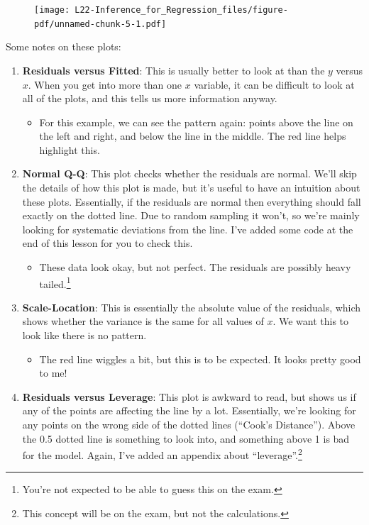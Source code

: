 \documentclass[
  letterpaper,
  DIV=11,
  numbers=noendperiod,
  oneside]{scrreprt}
\providecommand{\tightlist}{%
  \setlength{\itemsep}{0pt}\setlength{\parskip}{0pt}}\usepackage{longtable,booktabs,array}
\begin{document}
\begin{figure}[H]

{\centering \texttt{[image: L22-Inference\_for\_Regression\_files/figure-pdf/unnamed-chunk-5-1.pdf]}

}

\end{figure}

Some notes on these plots:

\begin{enumerate}
\def\labelenumi{\arabic{enumi}.}
\tightlist
\item
  \textbf{Residuals versus Fitted}: This is usually better to look at
  than the \(y\) versus \(x\). When you get into more than one \(x\)
  variable, it can be difficult to look at all of the plots, and this
  tells us more information anyway.

  \begin{itemize}
  \tightlist
  \item
    For this example, we can see the pattern again: points above the
    line on the left and right, and below the line in the middle. The
    red line helps highlight this.
  \end{itemize}
\item
  \textbf{Normal Q-Q}: This plot checks whether the residuals are
  normal. We'll skip the details of how this plot is made, but it's
  useful to have an intuition about these plots. Essentially, if the
  residuals are normal then everything should fall exactly on the dotted
  line. Due to random sampling it won't, so we're mainly looking for
  systematic deviations from the line. I've added some code at the end
  of this lesson for you to check this.

  \begin{itemize}
  \tightlist
  \item
    These data look okay, but not perfect. The residuals are possibly
    heavy tailed.\footnote{You're not expected to be able to guess this
      on the exam.}
  \end{itemize}
\item
  \textbf{Scale-Location}: This is essentially the absolute value of the
  residuals, which shows whether the variance is the same for all values
  of \(x\). We want this to look like there is no pattern.

  \begin{itemize}
  \tightlist
  \item
    The red line wiggles a bit, but this is to be expected. It looks
    pretty good to me!
  \end{itemize}
\item
  \textbf{Residuals versus Leverage}: This plot is awkward to read, but
  shows us if any of the points are affecting the line by a lot.
  Essentially, we're looking for any points on the wrong side of the
  dotted lines (``Cook's Distance''). Above the 0.5 dotted line is
  something to look into, and something above 1 is bad for the model.
  Again, I've added an appendix about ``leverage''.\footnote{This
    concept will be on the exam, but not the calculations.}


\end{enumerate}
\end{document}

